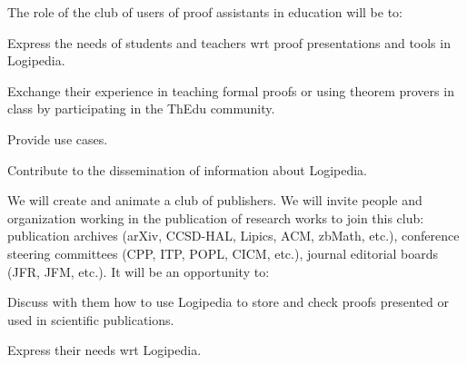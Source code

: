 \begin{workpackage}[id=dissemination,type=MGT,
  short={Dissemination, communication and exploitation},
  title={Dissemination, communication and exploitation},
  lead=Inr]
\begin{tasklist}
\begin{task}[id=teachers-club,
      title=Expanding the use of Logipedia in education,
      lead=Str,StrRM=2]


    The role of the club of users of proof assistants in education will be to:
    \begin{compactitem}
    \item Express the needs of students and teachers wrt proof
      presentations and tools in Logipedia.
    \item Exchange their experience in teaching formal proofs or using
      theorem provers in class by participating in the ThEdu community.
    \item Provide use cases.
    \item Contribute to the dissemination of information about Logipedia.
    \end{compactitem}

  \end{task}

  \begin{task}[id=publishers-club,
      title=Expanding the use of Logipedia in publishing,
      lead=Zib,ZibRM=2]
    We will create and animate a club of publishers. We will invite
    people and organization working in the publication of research
    works to join this club: publication archives (arXiv, CCSD-HAL,
    Lipics, ACM, zbMath, etc.), conference steering committees (CPP,
    ITP, POPL, CICM, etc.), journal editorial boards (JFR, JFM,
    etc.). It will be an opportunity to:
    \begin{compactitem}
    \item Discuss with them how to use Logipedia to store and check
      proofs presented or used in scientific publications.
    \item Express their needs wrt Logipedia.
    \end{compactitem}
  \end{task}


\end{tasklist}
\end{workpackage}
